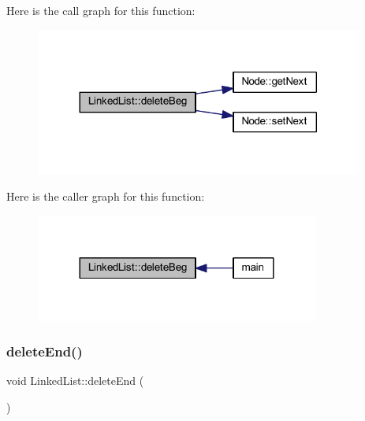 Here is the call graph for this function\+:
\nopagebreak
\begin{figure}[H]
\begin{center}
\leavevmode
\includegraphics[width=305pt]{class_linked_list_af8ccdfe634eed9feae0c641766e2e867_cgraph}
\end{center}
\end{figure}
Here is the caller graph for this function\+:
\nopagebreak
\begin{figure}[H]
\begin{center}
\leavevmode
\includegraphics[width=264pt]{class_linked_list_af8ccdfe634eed9feae0c641766e2e867_icgraph}
\end{center}
\end{figure}
\mbox{\label{class_linked_list_ab624ff78c70aaa517a3a98a4e7fec288}} 
\subsubsection{\texorpdfstring{delete\+End()}{deleteEnd()}}
{\footnotesize\ttfamily void Linked\+List\+::delete\+End (\begin{DoxyParamCaption}{ }\end{DoxyParamCaption})}

